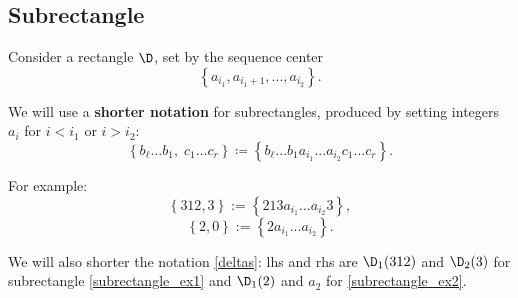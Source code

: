 \subsection{Subrectangle}
Consider a rectangle $\D$, set by the sequence center
\begin{equation*}
	\left\{ a_{i_1}, a_{i_1 + 1}, ..., a_{i_2} \right\}.
\end{equation*}

We will use a \textbf{shorter notation} for subrectangles, produced by setting integers
$a_i$ for $i < i_1$ or $i > i_2$:
\begin{equation*}
	\left\{ b_\ell...b_1,\; c_1...c_r\right\} \coloneqq
	\left\{ b_\ell...b_1 a_{i_1} ... a_{i_2} c_1...c_r\right\}.
\end{equation*}

For example:
\begin{equation}\tag{ex.1}\label{subrectangle_ex1}
	\left\{312, 3\right\} := \left\{ 213 a_{i_1} ... a_{i_2} 3\right\},
\end{equation}
\begin{equation}\tag{ex.2}\label{subrectangle_ex2}
	\left\{2, 0\right\} := \left\{ 2 a_{i_1} ... a_{i_2}  \right\}.
\end{equation}

We will also shorter the notation \ref{deltas}: lhs and rhs are $\D_1(312)$ and $\D_2(3)$ for subrectangle \ref{subrectangle_ex1} and $\D_1(2)$ and $a_2$ for \ref{subrectangle_ex2}.
